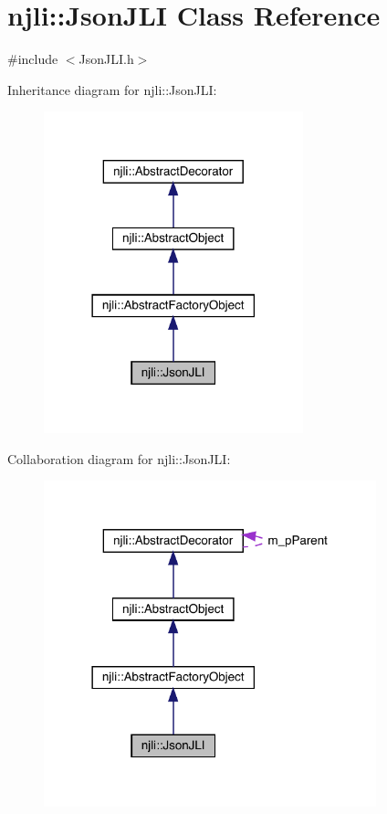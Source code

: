 \hypertarget{classnjli_1_1_json_j_l_i}{}\section{njli\+:\+:Json\+J\+LI Class Reference}
\label{classnjli_1_1_json_j_l_i}


{\ttfamily \#include $<$Json\+J\+L\+I.\+h$>$}



Inheritance diagram for njli\+:\+:Json\+J\+LI\+:\nopagebreak
\begin{figure}[H]
\begin{center}
\leavevmode
\includegraphics[width=213pt]{classnjli_1_1_json_j_l_i__inherit__graph}
\end{center}
\end{figure}


Collaboration diagram for njli\+:\+:Json\+J\+LI\+:\nopagebreak
\begin{figure}[H]
\begin{center}
\leavevmode
\includegraphics[width=273pt]{classnjli_1_1_json_j_l_i__coll__graph}
\end{center}
\end{figure}
